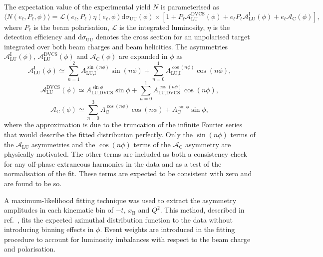 The expectation value of the experimental yield $N$ is parameterised as
\begin{equation}
 \langle N(e_{\ell},P_{\ell},\phi)\rangle =
\mathcal{L}(e_{\ell},P_{\ell})\eta(e_{\ell},\phi)\textrm{d}\sigma_{\textrm{UU}}
(\phi)\times
[1+P_{\ell}\mathcal{A}_{\textrm{LU}}^{\textrm{DVCS}}(\phi)+e_{\ell}P_{\ell}
\mathcal{A}_{\textrm{LU}}^{\textrm{I}}(\phi)+e_{\ell}\mathcal{A}_{\textrm{C}}
(\phi)],
\end{equation}
where $P_\ell$ is the beam polarisation, $\mathcal{L}$ is the integrated luminosity, $\eta$ is the detection
efficiency and d$\sigma_{\textrm{UU}}$ denotes the
cross section for an unpolarised target integrated over both beam charges and
beam helicities. The asymmetries $\mathcal{A}_{\textrm{LU}}^{\textrm{I}}(\phi)$,
$\mathcal{A}_{\textrm{LU}}^{\textrm{DVCS}}(\phi)$ and
$\mathcal{A}_{\textrm{C}}(\phi)$ are expanded in
$\phi$ as
\begin{equation}
\mathcal{A}_{\textrm{LU}}^{\textrm{I}}(\phi) \simeq \sum^{2}_{n=1}
A_{\textrm{LU,I}}^{\sin(n\phi)}\sin(n\phi) 
+ \sum^{1}_{n=0} A_{\textrm{LU,I}}^{\cos(n\phi)}\cos(n\phi), 
\label{alui_asym}
\end{equation}
\begin{equation}
 \mathcal{A}_{\textrm{LU}}^{\textrm{DVCS}}(\phi) \simeq 
A_{\textrm{LU,DVCS}}^{\sin\phi}\sin\phi 
+ \sum^{1}_{n=0} A_{\textrm{LU,DVCS}}^{\cos(n\phi)}\cos(n\phi), 
\label{aludvcs_asym}
\end{equation}
\begin{equation}
\mathcal{A}_{\textrm{C}}(\phi) \simeq \sum^{3}_{n=0}
A_{\textrm{C}}^{\cos(n\phi)}\cos(n\phi) 
+ A_{\textrm{C}}^{\sin\phi}\sin\phi,
\label{ac_asym}
\end{equation}
where the approximation is due to the truncation of the infinite
Fourier series that would describe the fitted distribution
  perfectly. Only the $\sin(n\phi)$ terms of the
$\mathcal{A}_{\textrm{LU}}$ asymmetries and the $\cos(n\phi)$ terms of the
$\mathcal{A}_{\textrm{C}}$ asymmetry are physically motivated. The other terms
are included as both a consistency check for any off-phase
extraneous harmonics in the data and as a test of the
normalisation of the fit. These terms are expected to be
consistent with zero and are found to be so.

A maximum-likelihood fitting technique \cite{Bar90} was used to
extract the asymmetry amplitudes in each kinematic bin of $-t$, $x_{\textrm{B}}$ and $Q^{2}$.
This method, described in ref.~\cite{Air08}, fits the expected
azimuthal distribution function to the data without introducing binning effects in $\phi$.
Event weights are introduced in the fitting procedure to account for
luminosity imbalances with respect to the beam charge and polarisation.

